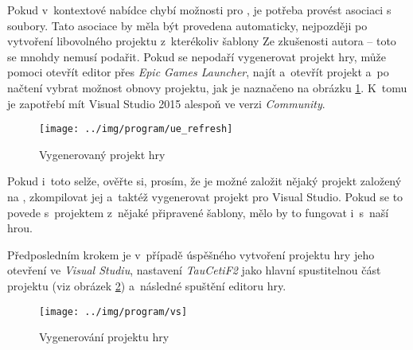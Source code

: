 \FloatBarrier


Pokud v~kontextové nabídce chybí možnosti pro \UE{}, je potřeba provést asociaci s~ soubory. Tato asociace by měla být provedena automaticky, nejpozději po vytvoření libovolného \CPP{} projektu z~kterékoliv šablony Ze zkušenosti autora -- toto se mnohdy nemusí podařit. Pokud se nepodaří vygenerovat projekt hry, může pomoci otevřít editor přes \textit{Epic Games Launcher}, najít a~otevřít projekt a~po načtení vybrat možnost obnovy projektu, jak je naznačeno na obrázku \ref{fig:ue_refresh}. K~tomu je zapotřebí mít Visual Studio 2015 alespoň ve verzi \textit{Community}.


\begin{figure}[!ht]\centering
\texttt{[image: ../img/program/ue\_refresh]}

\caption{Vygenerovaný projekt hry}
\label{fig:ue_refresh}

\end{figure}

\FloatBarrier



Pokud i~toto selže, ověřte si, prosím, že je možné založit nějaký projekt založený na \CPP{}, zkompilovat jej a~taktéž vygenerovat projekt pro Visual Studio. Pokud se to povede s~projektem z~nějaké připravené šablony, mělo by to fungovat i~s~naší hrou.


Předposledním krokem je v~případě úspěšného vytvoření projektu hry jeho otevření ve \textit{Visual Studiu}, nastavení \textit{TauCetiF2} jako hlavní spustitelnou část projektu (viz obrázek \ref{fig:vs}) a~následné spuštění  editoru hry.


\begin{figure}[!ht]\centering
\texttt{[image: ../img/program/vs]}

\caption{Vygenerování projektu hry}
\label{fig:vs}

\end{figure}

\FloatBarrier




